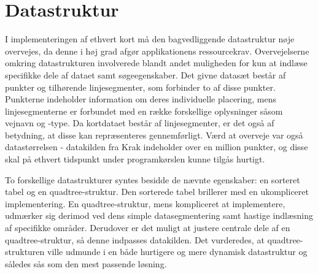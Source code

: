 \section{Datastruktur}
\label{sec:datastruktur}
I implementeringen af ethvert kort må den bagvedliggende datastruktur nøje overvejes, da denne i høj grad afgør applikationens ressourcekrav. Overvejelserne omkring datastrukturen involverede blandt andet muligheden for kun at indlæse specifikke dele af dataet samt søgeegenskaber. Det givne datasæt består af punkter og tilhørende linjesegmenter, som forbinder to af disse punkter. Punkterne indeholder information om deres individuelle placering, mens linjesegmenterne er forbundet med en række forskellige oplysninger såsom vejnavn og -type. Da kortdataet består af linjesegmenter, er det også af betydning, at disse kan repræsenteres gennemførligt. Værd at overveje var også datastørrelsen - datakilden fra Krak indeholder over en million punkter, og disse skal på ethvert tidspunkt under programkørslen kunne tilgås hurtigt.

To forskellige datastrukturer syntes besidde de nævnte egenskaber: en sorteret tabel og en quadtree-struktur. Den sorterede tabel brillerer med en ukompliceret implementering. En quadtree-struktur, mens kompliceret at implementere, udmærker sig derimod ved dens simple datasegmentering samt hastige indlæsning af specifikke områder. Derudover er det muligt at justere centrale dele af en quadtree-struktur, så denne indpasses datakilden. Det vurderedes, at quadtree-strukturen ville udmunde i en både hurtigere og mere dynamisk datastruktur og således sås som den mest passende løsning.
